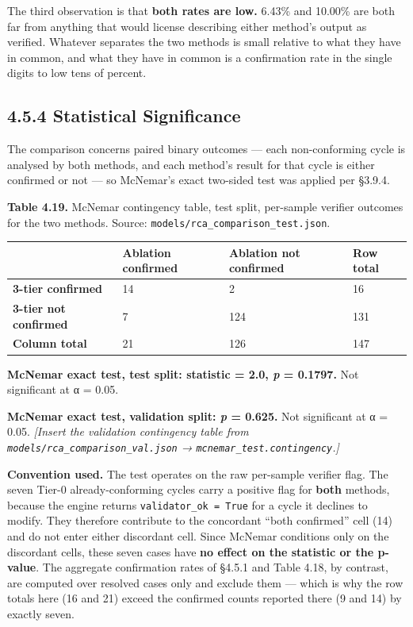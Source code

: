 The third observation is that \textbf{both rates are low.} 6.43\% and 10.00\% are both far from anything that would license describing either method's output as verified. Whatever separates the two methods is small relative to what they have in common, and what they have in common is a confirmation rate in the single digits to low tens of percent.

\hypertarget{statistical-significance}{%
\subsection{4.5.4 Statistical Significance}\label{statistical-significance}}

The comparison concerns paired binary outcomes --- each non-conforming cycle is analysed by both methods, and each method's result for that cycle is either confirmed or not --- so McNemar's exact two-sided test was applied per §3.9.4.

\textbf{Table 4.19.} McNemar contingency table, test split, per-sample verifier outcomes for the two methods. Source: \texttt{models/rca\_comparison\_test.json}.

\begin{longtable}[]{@{}llll@{}}
\toprule\noalign{}
& Ablation confirmed & Ablation not confirmed & Row total \\
\midrule\noalign{}
\endhead
\bottomrule\noalign{}
\endlastfoot
\textbf{3-tier confirmed} & 14 & 2 & 16 \\
\textbf{3-tier not confirmed} & 7 & 124 & 131 \\
\textbf{Column total} & 21 & 126 & 147 \\
\end{longtable}

\textbf{McNemar exact test, test split: statistic = 2.0, \emph{p} = 0.1797.} Not significant at α = 0.05.

\textbf{McNemar exact test, validation split: \emph{p} = 0.625.} Not significant at α = 0.05. \emph{{[}Insert the validation contingency table from \texttt{models/rca\_comparison\_val.json} → \texttt{mcnemar\_test.contingency}.{]}}

\textbf{Convention used.} The test operates on the raw per-sample verifier flag. The seven Tier-0 already-conforming cycles carry a positive flag for \textbf{both} methods, because the engine returns \texttt{validator\_ok\ =\ True} for a cycle it declines to modify. They therefore contribute to the concordant ``both confirmed'' cell (14) and do not enter either discordant cell. Since McNemar conditions only on the discordant cells, these seven cases have \textbf{no effect on the statistic or the p-value}. The aggregate confirmation rates of §4.5.1 and Table 4.18, by contrast, are computed over resolved cases only and exclude them --- which is why the row totals here (16 and 21) exceed the confirmed counts reported there (9 and 14) by exactly seven.

